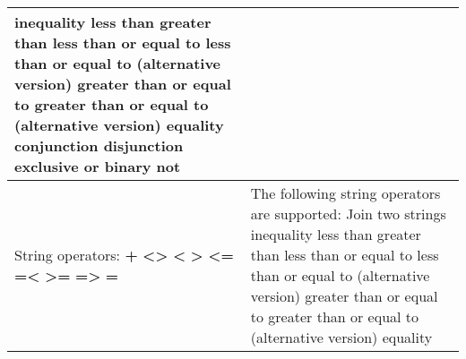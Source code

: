 \begin{table}[]
\begin{tabular}{|p{4cm}|p{10cm}|}
inequality\newline
less than\newline
greater than\newline
less than or equal to\newline
less than or equal to (alternative version)\newline
greater than or equal to\newline
greater than or equal to (alternative version)\newline
equality\newline
conjunction\newline
disjunction\newline
exclusive or\newline
binary not
\\ \hline
String operators:\newline
\textbf{+}\newline
\textbf{<>}\newline
\textbf{<}\newline
\textbf{>}\newline
\textbf{<=}\newline
\textbf{=<}\newline
\textbf{>=}\newline
\textbf{=>}\newline
\textbf{=}
&
The following string operators are supported:\newline
Join two strings\newline
inequality\newline
less than\newline
greater than\newline
less than or equal to\newline
less than or equal to (alternative version)\newline
greater than or equal to\newline 
greater than or equal to (alternative version)\newline
equality
\\ \hline
\end{tabular}
\end{table}
